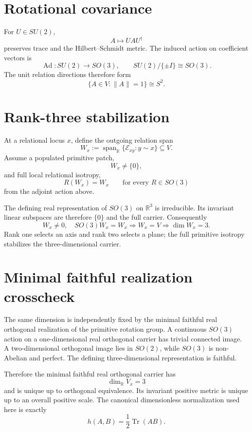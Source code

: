 \section{Rotational covariance}

For \(U\in SU(2)\),
\[
A\mapsto UAU^\dagger
\]
preserves trace and the Hilbert--Schmidt metric.  The induced action on coefficient
vectors is
\[
\boxed{
\operatorname{Ad}:SU(2)\longrightarrow SO(3),
\qquad
SU(2)/\{\pm I\}\cong SO(3).
}
\]
The unit relation directions therefore form
\[
\boxed{
\{A\in V:\|A\|=1\}\cong S^2.
}
\]

\section{Rank-three stabilization}

At a relational locus \(x\), define the outgoing relation span
\[
W_x
:=
\operatorname{span}_{\mathbb R}
\{\mathcal E_{xy}:y\sim x\}
\subseteq V.
\]
Assume a populated primitive patch,
\[
W_x\neq\{0\},
\]
and full local relational isotropy,
\[
R(W_x)=W_x
\qquad
\text{for every }R\in SO(3)
\]
from the adjoint action above.

The defining real representation of \(SO(3)\) on \(\mathbb R^3\) is irreducible.
Its invariant linear subspaces are therefore \(\{0\}\) and the full carrier.
Consequently
\[
\boxed{
W_x\neq0,\quad SO(3)W_x=W_x
\Longrightarrow
W_x=V
\Longrightarrow
\dim W_x=3.
}
\]
Rank one selects an axis and rank two selects a plane; the full primitive isotropy
stabilizes the three-dimensional carrier.

\section{Minimal faithful realization crosscheck}

The same dimension is independently fixed by the minimal faithful real orthogonal
realization of the primitive rotation group. A continuous \(SO(3)\) action on a
one-dimensional real orthogonal carrier has trivial connected image.  A
two-dimensional orthogonal image lies in \(SO(2)\), while \(SO(3)\) is non-Abelian
and perfect.  The defining three-dimensional representation is faithful.

Therefore the minimal faithful real orthogonal carrier has
\[
\boxed{\dim_{\mathbb R}V_x=3}
\]
and is unique up to orthogonal equivalence.  Its invariant positive metric is
unique up to an overall positive scale.  The canonical dimensionless
normalization used here is exactly
\[
h(A,B)=\frac12\operatorname{Tr}(AB).
\]

